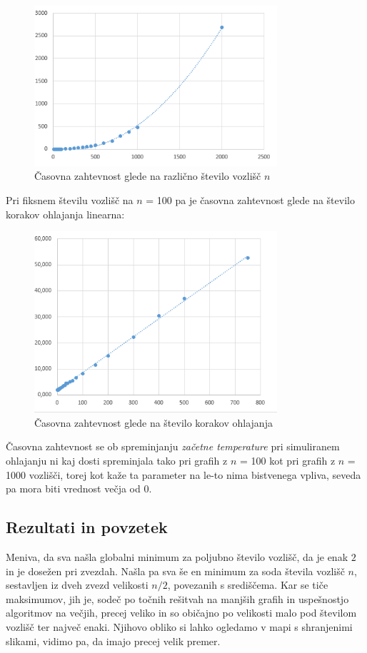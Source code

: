 \documentclass[a4paper, 12 pt]{article}
\begin{document}
\begin{figure}[H]
\centering
  \includegraphics[width=9cm]{casovna_p1_n.png}
  \caption{Časovna zahtevnost glede na različno število vozlišč $n$}
  \label{fig:p1_časovna_zaht_n} 
\end{figure}

\pagebreak
Pri fiksnem številu vozlišč na $n$ = 100 pa je časovna zahtevnost glede na število korakov ohlajanja linearna:

\begin{figure}[H]
\centering
  \includegraphics[width=9cm]{casovna_p1_kmax.png}
  \caption{Časovna zahtevnost glede na število korakov ohlajanja}
  \label{fig:p1_časovna_zaht_kmax} 
\end{figure}

Časovna zahtevnost se ob spreminjanju \textit{začetne temperature} pri simuliranem ohlajanju ni kaj dosti spreminjala tako pri grafih z $n$ = 100 kot pri grafih z $n$ = 1000 vozlišči, torej kot kaže ta parameter na le-to nima bistvenega vpliva, seveda pa mora biti vrednost večja od 0.

\subsection{Rezultati in povzetek}

Meniva, da sva našla globalni minimum za poljubno število vozlišč, da je enak $2$ in je dosežen pri zvezdah. Našla pa sva še en minimum za soda števila vozlišč $n$, sestavljen iz dveh zvezd velikosti $n/2$, povezanih s središčema. Kar se tiče maksimumov, jih je, sodeč po točnih rešitvah na manjših grafih in uspešnostjo algoritmov na večjih, precej veliko in so običajno po velikosti malo pod številom vozlišč ter največ enaki. Njihovo obliko si lahko ogledamo v mapi s shranjenimi slikami, vidimo pa, da imajo precej velik premer.
\end{document}
